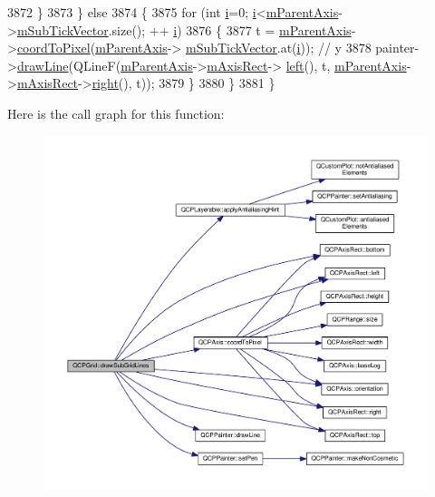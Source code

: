 \begin{DoxyCode}
3872     \}
3873   \} \textcolor{keywordflow}{else}
3874   \{
3875     \textcolor{keywordflow}{for} (\textcolor{keywordtype}{int} \hyperlink{_comparision_pictures_2_createtest_image_8m_a6f6ccfcf58b31cb6412107d9d5281426}{i}=0; \hyperlink{_comparision_pictures_2_createtest_image_8m_a6f6ccfcf58b31cb6412107d9d5281426}{i}<\hyperlink{class_q_c_p_grid_a9a8a76731e6e737b65b929fd1995cc88}{mParentAxis}->\hyperlink{class_q_c_p_axis_a28353081e0ff35c3fe5ced923a287faa}{mSubTickVector}.size(); ++
      \hyperlink{_comparision_pictures_2_createtest_image_8m_a6f6ccfcf58b31cb6412107d9d5281426}{i})
3876     \{
3877       t = \hyperlink{class_q_c_p_grid_a9a8a76731e6e737b65b929fd1995cc88}{mParentAxis}->\hyperlink{class_q_c_p_axis_a985ae693b842fb0422b4390fe36d299a}{coordToPixel}(\hyperlink{class_q_c_p_grid_a9a8a76731e6e737b65b929fd1995cc88}{mParentAxis}->
      \hyperlink{class_q_c_p_axis_a28353081e0ff35c3fe5ced923a287faa}{mSubTickVector}.at(\hyperlink{_comparision_pictures_2_createtest_image_8m_a6f6ccfcf58b31cb6412107d9d5281426}{i})); \textcolor{comment}{// y}
3878       painter->\hyperlink{class_q_c_p_painter_a0b4b1b9bd495e182c731774dc800e6e0}{drawLine}(QLineF(\hyperlink{class_q_c_p_grid_a9a8a76731e6e737b65b929fd1995cc88}{mParentAxis}->\hyperlink{class_q_c_p_axis_a6f150b65a202f32936997960e331dfcb}{mAxisRect}->
      \hyperlink{class_q_c_p_axis_rect_a55b3ecf72a3a65b053f7651b88db458d}{left}(), t, \hyperlink{class_q_c_p_grid_a9a8a76731e6e737b65b929fd1995cc88}{mParentAxis}->\hyperlink{class_q_c_p_axis_a6f150b65a202f32936997960e331dfcb}{mAxisRect}->\hyperlink{class_q_c_p_axis_rect_a6d0f989fc552aa2b563cf82f8fc81e61}{right}(), t));
3879     \}
3880   \}
3881 \}
\end{DoxyCode}


Here is the call graph for this function\+:\nopagebreak
\begin{figure}[H]
\begin{center}
\leavevmode
\includegraphics[width=350pt]{class_q_c_p_grid_afa5d9d12de419e881f381f2ab7cb414d_cgraph}
\end{center}
\end{figure}




